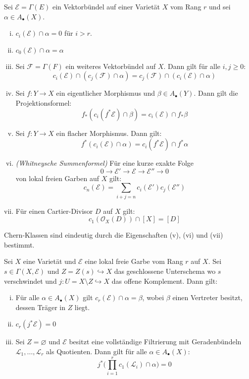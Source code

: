 \documentclass[10pt,a4paper]{article}
\begin{document}
\begin{proposition}
Sei $\mathcal{E} = \Gamma(E)$ ein Vektorbündel auf einer Varietät $X$ vom Rang $r$ und sei $\alpha\in A_\bullet(X)$.
\begin{enumerate}[(i)]
\item $c_i(\mathcal{E})\cap \alpha = 0$ für $i > r$.
\item $c_0(\mathcal{E})\cap \alpha = \alpha$
\item Sei $\mathcal{F} = \Gamma(F)$ ein weiteres Vektorbündel auf $X$. Dann gilt für alle $i,j\geq 0$:
\[ c_i(\mathcal{E})\cap (c_j(\mathcal{F}) \cap \alpha) = c_j(\mathcal{F}) \cap (c_i(\mathcal{E})\cap \alpha) \]
\item Sei $f:Y\to X$ ein eigentlicher Morphismus und $\beta\in A_\bullet(Y)$. Dann gilt die Projektionsformel:
\[ f_\ast(c_i(f^\ast\mathcal{E})\cap\beta) = c_i(\mathcal{E})\cap f_\ast\beta \]
\item Sei $f:Y\to X$ ein flacher Morphismus. Dann gilt:
\[ f^\ast(c_i(\mathcal{E})\cap \alpha) = c_i(f^\ast\mathcal{E})\cap f^\ast\alpha \]
\item \textit{(Whitneysche Summenformel)} Für eine kurze exakte Folge 
\[ 0\longrightarrow\mathcal{E}'\longrightarrow\mathcal{E}\longrightarrow \mathcal{E}''\longrightarrow 0 \]
von lokal freien Garben auf $X$ gilt:
\[ c_n(\mathcal{E}) = \sum_{i+j = n}c_i(\mathcal{E}')c_j(\mathcal{E}'') \]
\item Für einen Cartier-Divisor $D$ auf $X$ gilt:
\[ c_1(\mathcal{O}_X(D))\cap [X] = [D] \]
\end{enumerate}
\end{proposition}

\begin{remark}
Chern-Klassen sind eindeutig durch die Eigenschaften (v), (vi) und (vii) bestimmt.
\end{remark}

\begin{proposition}
Sei $X$ eine Varietät und $\mathcal{E}$ eine lokal freie Garbe vom Rang $r$ auf $X$. Sei $s\in\Gamma(X,\mathcal{E})$ und $Z=Z(s)\hookrightarrow X$ das geschlossene Unterschema wo $s$ verschwindet und $j:U=X\setminus Z\hookrightarrow X$ das offene Komplement. Dann gilt:
\begin{enumerate}[(i)]
\item Für alle $\alpha\in A_\bullet(X)$ gilt $c_r(\mathcal{E})\cap\alpha = \beta$, wobei $\beta$ einen Vertreter besitzt, dessen Träger in $Z$ liegt.
\item $c_r(j^\ast\mathcal{E}) = 0$
\item Sei $Z=\varnothing$ und $\mathcal{E}$ besitzt eine vollständige Filtrierung mit Geradenbündeln $\mathcal{L}_1,\ldots,\mathcal{L}_r$ als Quotienten. Dann gilt für alle $\alpha\in A_\bullet(X)$:
\[ j^\ast\Big(\prod_{i=1}^r c_1(\mathcal{L}_i)\cap\alpha \Big) = 0 \]
\end{enumerate}
\end{proposition}
\end{document}
